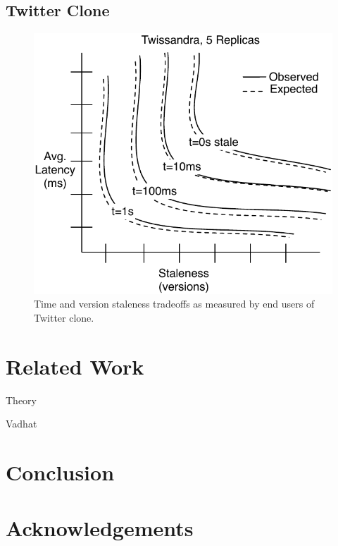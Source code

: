 \documentclass{vldb}
\begin{document}
\subsection{Twitter Clone}

\begin{figure}
\centering
\includegraphics[width=.8\columnwidth]{figs/twissandra.pdf}
\caption{Time and version staleness tradeoffs as measured by end users
  of Twitter clone.}
\label{fig:twissandra}
\end{figure}

\section{Related Work}

Theory

Vadhat

\section{Conclusion}

\section*{Acknowledgements}

\balance



\end{document}
